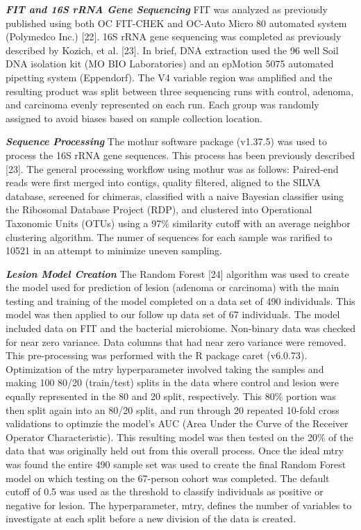 \documentclass[12pt,]{article}
\begin{document}
\textbf{\emph{FIT and 16S rRNA Gene Sequencing}} FIT was analyzed as
previously published using both OC FIT-CHEK and OC-Auto Micro 80
automated system (Polymedco Inc.) {[}22{]}. 16S rRNA gene sequencing was
completed as previously described by Kozich, et al. {[}23{]}. In brief,
DNA extraction used the 96 well Soil DNA isolation kit (MO BIO
Laboratories) and an epMotion 5075 automated pipetting system
(Eppendorf). The V4 variable region was amplified and the resulting
product was split between three sequencing runs with control, adenoma,
and carcinoma evenly represented on each run. Each group was randomly
assigned to avoid biases based on sample collection location.

\textbf{\emph{Sequence Processing}} The mothur software package
(v1.37.5) was used to process the 16S rRNA gene sequences. This process
has been previously described {[}23{]}. The general processing workflow
using mothur was as follows: Paired-end reads were first merged into
contigs, quality filtered, aligned to the SILVA database, screened for
chimeras, classified with a naive Bayesian classifier using the
Ribosomal Database Project (RDP), and clustered into Operational
Taxonomic Units (OTUs) using a 97\% similarity cutoff with an average
neighbor clustering algorithm. The numer of sequences for each sample
was rarified to 10521 in an attempt to minimize uneven sampling.

\textbf{\emph{Lesion Model Creation}} The Random Forest {[}24{]}
algorithm was used to create the model used for prediction of lesion
(adenoma or carcinoma) with the main testing and training of the model
completed on a data set of 490 individuals. This model was then applied
to our follow up data set of 67 individuals. The model included data on
FIT and the bacterial microbiome. Non-binary data was checked for near
zero variance. Data columns that had near zero variance were removed.
This pre-processing was performed with the R package caret (v6.0.73).
Optimization of the mtry hyperparameter involved taking the samples and
making 100 80/20 (train/test) splits in the data where control and
lesion were equally represented in the 80 and 20 split, respectively.
This 80\% portion was then split again into an 80/20 split, and run
through 20 repeated 10-fold cross validations to optimzie the model's
AUC (Area Under the Curve of the Receiver Operator Characteristic). This
resulting model was then tested on the 20\% of the data that was
originally held out from this overall process. Once the ideal mtry was
found the entire 490 sample set was used to create the final Random
Forest model on which testing on the 67-person cohort was completed. The
default cutoff of 0.5 was used as the threshold to classify individuals
as positive or negative for lesion. The hyperparameter, mtry, defines
the number of variables to investigate at each split before a new
division of the data is created.
\end{document}
